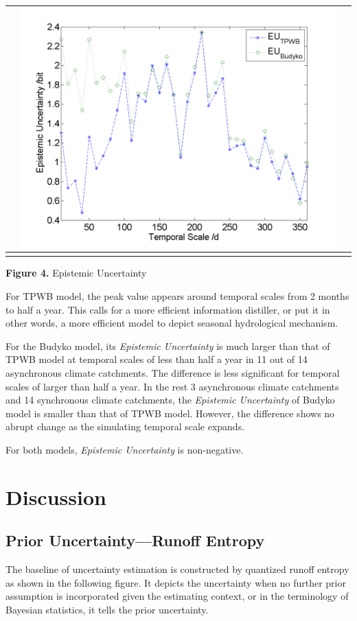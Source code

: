 \documentclass[review]{elsarticle}
\begin{document}
\begin{table}[H]
{\begin{tabular}{ccc}
&\begin{minipage}{.6\textwidth}\includegraphics[width=\linewidth]{resultgraph/11532500EU.png}\end{minipage}
\\
\hline
\\
\end{tabular}
}
\Large{\textbf{Figure 4.} Epistemic Uncertainty }
\end{table} 
For TPWB model, the peak value appears around temporal scales from 2 months to half a year. This calls for a more efficient information distiller, or put it in other words, a more efficient model to depict seasonal hydrological mechanism.  

For the Budyko model, its \emph{Epistemic Uncertainty} is much larger than that of TPWB model at temporal scales of less than half a year in 11 out of 14 asynchronous climate catchments. The difference is less significant for temporal scales of larger than half a year. In the rest 3 asynchronous climate catchments and 14 synchronous climate catchments, the \emph{Epistemic Uncertainty} of Budyko model is smaller than that of TPWB model. However, the difference shows no abrupt change as the simulating temporal scale expands. 




For both models,  \emph{Epistemic Uncertainty} is non-negative.

\section{Discussion}
\subsection{Prior Uncertainty---Runoff Entropy}
The baseline of uncertainty estimation is constructed by  quantized runoff entropy as shown in the following figure. It depicts the uncertainty when no further prior assumption is incorporated given the estimating context, or in the terminology of Bayesian statistics, it tells the prior uncertainty.
\end{document}
